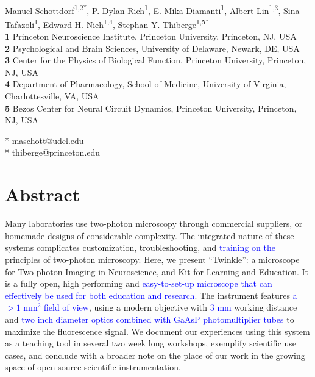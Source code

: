 \documentclass[10pt,letterpaper]{article}
\begin{document}
\vspace*{0.2in}

\begin{flushleft}
{\Large
\textbf{}
}
\newline
\\
Manuel Schottdorf\textsuperscript{1,2*}, %
P. Dylan Rich\textsuperscript{1}, %
E. Mika Diamanti\textsuperscript{1}, %
Albert Lin\textsuperscript{1,3}, %
Sina Tafazoli\textsuperscript{1}, %
Edward H. Nieh\textsuperscript{1,4}, %
Stephan Y. Thiberge\textsuperscript{1,5*} %
\\
\bigskip
\textbf{1} Princeton Neuroscience Institute, Princeton University, Princeton, NJ, USA\\
\textbf{2} Psychological and Brain Sciences, University of Delaware, Newark, DE, USA\\
\textbf{3} Center for the Physics of Biological Function, Princeton University, Princeton, NJ, USA\\
\textbf{4} Department of Pharmacology, School of Medicine, University of Virginia, Charlottesville, VA, USA \\
\textbf{5} Bezos Center for Neural Circuit Dynamics, Princeton University, Princeton, NJ, USA\\
\bigskip

* maschott@udel.edu\\
* thiberge@princeton.edu

\end{flushleft}
\section*{Abstract}
Many laboratories use two-photon microscopy through commercial suppliers, or homemade designs of considerable complexity. The integrated nature of these systems complicates customization, troubleshooting, and \textcolor{blue}{training on the} principles of two-photon microscopy. Here, we present ``Twinkle'': a microscope for Two-photon Imaging in Neuroscience, and Kit for Learning and Education. It is a fully open, high performing and \textcolor{blue}{easy-to-set-up microscope that can effectively be used for both education and research}. The instrument features \textcolor{blue}{a $>1\text{ mm}^2$ field of view}, using a modern objective with \textcolor{blue}{3 mm} working distance and \textcolor{blue}{two inch diameter optics combined with GaAsP photomultiplier tubes} to maximize the fluorescence signal. We document our experiences using this system as a teaching tool in several two week long workshops, exemplify scientific use cases, and conclude with a broader note on the place of our work in the growing space of open-source scientific instrumentation.
\end{document}
